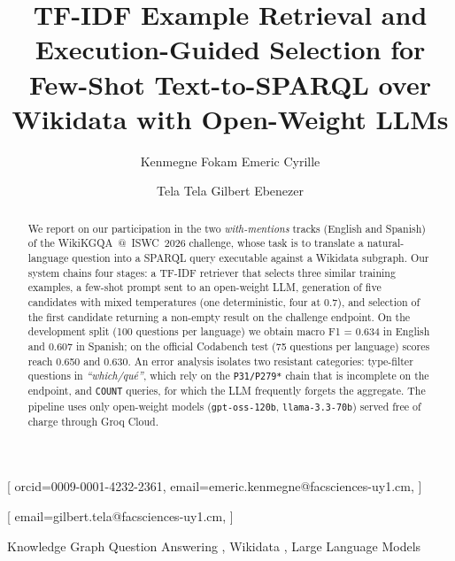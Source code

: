 \documentclass[]{ceurart}
\begin{document}


\title{TF-IDF Example Retrieval and Execution-Guided Selection for Few-Shot Text-to-SPARQL over Wikidata with Open-Weight LLMs}

\tnotemark[1]

\author[1]{Kenmegne Fokam Emeric Cyrille}[%
orcid=0009-0001-4232-2361,
email=emeric.kenmegne@facsciences-uy1.cm,
]
\cormark[1]

\author[1]{Tela Tela Gilbert Ebenezer}[%
email=gilbert.tela@facsciences-uy1.cm,
]

\address[1]{Department of Computer Science, University of Yaound\'e~I, Yaound\'e, Cameroon}


\begin{abstract}
We report on our participation in the two \emph{with-mentions} tracks (English and Spanish) of the WikiKGQA~@~ISWC~2026 challenge, whose task is to translate a natural-language question into a SPARQL query executable against a Wikidata subgraph. Our system chains four stages: a TF-IDF retriever that selects three similar training examples, a few-shot prompt sent to an open-weight LLM, generation of five candidates with mixed temperatures (one deterministic, four at 0.7), and selection of the first candidate returning a non-empty result on the challenge endpoint. On the development split (100 questions per language) we obtain macro F1 = 0.634 in English and 0.607 in Spanish; on the official Codabench test (75 questions per language) scores reach 0.650 and 0.630. An error analysis isolates two resistant categories: type-filter questions in \emph{``which/qu\'e''}, which rely on the \texttt{P31/P279*} chain that is incomplete on the endpoint, and \texttt{COUNT} queries, for which the LLM frequently forgets the aggregate. The pipeline uses only open-weight models (\texttt{gpt-oss-120b}, \texttt{llama-3.3-70b}) served free of charge through Groq Cloud.
\end{abstract}

\begin{keywords}
  Knowledge Graph Question Answering \sep
  Wikidata \sep
  Large Language Models
\end{keywords}
\end{document}
